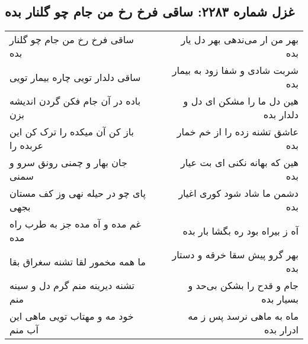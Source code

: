 \begin{center}
\section*{غزل شماره ۲۲۸۳: ساقی فرخ رخ من جام چو گلنار بده}
\label{sec:2283}
\begin{longtable}{l p{0.5cm} r}
ساقی فرخ رخ من جام چو گلنار بده
&&
بهر من ار می‌ندهی بهر دل یار بده
\\
ساقی دلدار تویی چاره بیمار تویی
&&
شربت شادی و شفا زود به بیمار بده
\\
باده در آن جام فکن گردن اندیشه بزن
&&
هین دل ما را مشکن ای دل و دلدار بده
\\
باز کن آن میکده را ترک کن این عربده را
&&
عاشق تشنه زده را از خم خمار بده
\\
جان بهار و چمنی رونق سرو و سمنی
&&
هین که بهانه نکنی ای بت عیار بده
\\
پای چو در حیله نهی وز کف مستان بجهی
&&
دشمن ما شاد شود کوری اغیار بده
\\
غم مده و آه مده جز به طرب راه مده
&&
آه ز بیراه بود ره بگشا بار بده
\\
ما همه مخمور لقا تشنه سغراق بقا
&&
بهر گرو پیش سقا خرقه و دستار بده
\\
تشنه دیرینه منم گرم دل و سینه منم
&&
جام و قدح را بشکن بی‌حد و بسیار بده
\\
خود مه و مهتاب تویی ماهی این آب منم
&&
ماه به ماهی نرسد پس ز مه ادرار بده
\\
\end{longtable}
\end{center}
